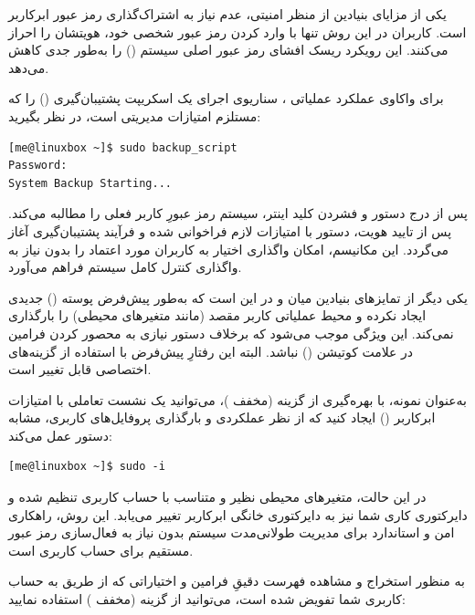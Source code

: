 یکی از مزایای بنیادین  از منظر امنیتی، عدم نیاز به اشتراک‌گذاری رمز عبور ابرکاربر است. کاربران در این روش تنها با وارد کردن رمز عبور شخصی خود، هویتشان را احراز می‌کنند. این رویکرد ریسک افشای رمز عبور اصلی سیستم () را به‌طور جدی کاهش می‌دهد.

برای واکاوی عملکرد عملیاتی ، سناریوی اجرای یک اسکریپت پشتیبان‌گیری () را که مستلزم امتیازات مدیریتی است، در نظر بگیرید:

\begin{latin}
\begin{lstlisting}
[me@linuxbox ~]$ sudo backup_script
Password:
System Backup Starting...
\end{lstlisting}
\end{latin}

پس از درج دستور  و فشردن کلید اینتر، سیستم رمز عبورِ کاربر فعلی را مطالبه می‌کند. پس از تایید هویت، دستور با امتیازات لازم فراخوانی شده و فرآیند پشتیبان‌گیری آغاز می‌گردد. این مکانیسم، امکان واگذاری اختیار به کاربران مورد اعتماد را بدون نیاز به واگذاری کنترل کامل سیستم فراهم می‌آورد.

یکی دیگر از تمایزهای بنیادین میان  و  در این است که  به‌طور پیش‌فرض پوسته () جدیدی ایجاد نکرده و محیط عملیاتی کاربر مقصد (مانند متغیرهای محیطی) را بارگذاری نمی‌کند. این ویژگی موجب می‌شود که برخلاف دستور  نیازی به محصور کردن فرامین در علامت کوتیشن () نباشد. البته این رفتارِ پیش‌فرض با استفاده از گزینه‌های اختصاصی قابل تغییر است.

به‌عنوان نمونه، با بهره‌گیری از گزینه  (مخفف )، می‌توانید یک نشست تعاملی با امتیازات ابرکاربر () ایجاد کنید که از نظر عملکردی و بارگذاری پروفایل‌های کاربری، مشابه دستور  عمل می‌کند:

\begin{latin}
\begin{lstlisting}
[me@linuxbox ~]$ sudo -i
\end{lstlisting}
\end{latin}

در این حالت، متغیرهای محیطی نظیر  و  متناسب با حساب کاربری  تنظیم شده و دایرکتوری کاری شما نیز به دایرکتوری خانگی ابرکاربر تغییر می‌یابد. این روش، راهکاری امن و استاندارد برای مدیریت طولانی‌مدت سیستم بدون نیاز به فعال‌سازی رمز عبور مستقیم برای حساب کاربری  است.

به منظور استخراج و مشاهده فهرست دقیقِ فرامین و اختیاراتی که از طریق  به حساب کاربری شما تفویض شده است، می‌توانید از گزینه  (مخفف ) استفاده نمایید:

